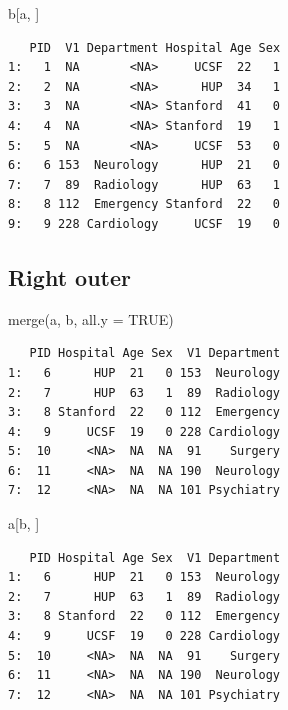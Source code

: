 \documentclass[
]{book}
\newenvironment{Shaded}{\begin{snugshade}}{\end{snugshade}}
\newcommand{\AttributeTok}[1]{\textcolor[rgb]{0.77,0.63,0.00}{#1}}
\newcommand{\ConstantTok}[1]{\textcolor[rgb]{0.00,0.00,0.00}{#1}}
\newcommand{\FunctionTok}[1]{\textcolor[rgb]{0.00,0.00,0.00}{#1}}
\newcommand{\NormalTok}[1]{#1}
\begin{document}
\begin{Shaded}
\begin{Highlighting}[]
\NormalTok{b[a, ]}
\end{Highlighting}
\end{Shaded}

\begin{verbatim}
   PID  V1 Department Hospital Age Sex
1:   1  NA       <NA>     UCSF  22   1
2:   2  NA       <NA>      HUP  34   1
3:   3  NA       <NA> Stanford  41   0
4:   4  NA       <NA> Stanford  19   1
5:   5  NA       <NA>     UCSF  53   0
6:   6 153  Neurology      HUP  21   0
7:   7  89  Radiology      HUP  63   1
8:   8 112  Emergency Stanford  22   0
9:   9 228 Cardiology     UCSF  19   0
\end{verbatim}

\hypertarget{right-outer}{%
\subsection{Right outer}\label{right-outer}}

\begin{Shaded}
\begin{Highlighting}[]
\FunctionTok{merge}\NormalTok{(a, b, }\AttributeTok{all.y =} \ConstantTok{TRUE}\NormalTok{)}
\end{Highlighting}
\end{Shaded}

\begin{verbatim}
   PID Hospital Age Sex  V1 Department
1:   6      HUP  21   0 153  Neurology
2:   7      HUP  63   1  89  Radiology
3:   8 Stanford  22   0 112  Emergency
4:   9     UCSF  19   0 228 Cardiology
5:  10     <NA>  NA  NA  91    Surgery
6:  11     <NA>  NA  NA 190  Neurology
7:  12     <NA>  NA  NA 101 Psychiatry
\end{verbatim}

\begin{Shaded}
\begin{Highlighting}[]
\NormalTok{a[b, ]}
\end{Highlighting}
\end{Shaded}

\begin{verbatim}
   PID Hospital Age Sex  V1 Department
1:   6      HUP  21   0 153  Neurology
2:   7      HUP  63   1  89  Radiology
3:   8 Stanford  22   0 112  Emergency
4:   9     UCSF  19   0 228 Cardiology
5:  10     <NA>  NA  NA  91    Surgery
6:  11     <NA>  NA  NA 190  Neurology
7:  12     <NA>  NA  NA 101 Psychiatry
\end{verbatim}
\end{document}
